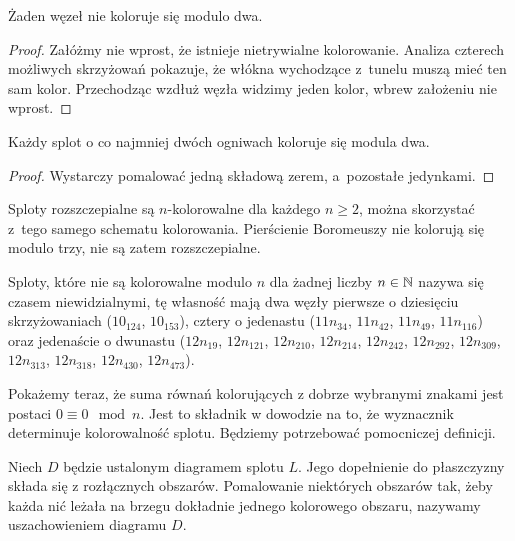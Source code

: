 \begin{proposition}
\label{prp:no_colourings_mod_2}%
    Żaden węzeł nie koloruje się modulo dwa.
\end{proposition}

\begin{proof}
    Załóżmy nie wprost, że istnieje nietrywialne kolorowanie.
    Analiza czterech możliwych skrzyżowań pokazuje, że włókna wychodzące z~tunelu muszą mieć ten sam kolor.
    Przechodząc wzdłuż węzła widzimy jeden kolor, wbrew założeniu nie wprost.
\end{proof}

\begin{proposition}
    Każdy splot o co najmniej dwóch ogniwach koloruje się modula dwa.
\end{proposition}

\begin{proof}
    Wystarczy pomalować jedną składową zerem, a~pozostałe jedynkami.
\end{proof}

Sploty rozszczepialne są $n$-kolorowalne dla każdego $n \ge 2$, można skorzystać z~tego samego schematu kolorowania.
%
Pierścienie Boromeuszy nie kolorują się modulo trzy, nie są zatem rozszczepialne.
\label{boromean_not_splittable}%
%

Sploty, które nie są kolorowalne modulo $n$ dla żadnej liczby $n \in \mathbb N$ nazywa się czasem niewidzialnymi, tę własność mają dwa węzły pierwsze o dziesięciu skrzyżowaniach ($10_{124}$, $10_{153}$), cztery o jedenastu ($11n_{34}$, $11n_{42}$, $11n_{49}$, $11n_{116}$) oraz jedenaście o dwunastu ($12n_{19}$, $12n_{121}$, $12n_{210}$, $12n_{214}$, $12n_{242}$, $12n_{292}$, $12n_{309}$, $12n_{313}$, $12n_{318}$, $12n_{430}$, $12n_{473}$).
%

Pokażemy teraz, że suma równań kolorujących z dobrze wybranymi znakami jest postaci $0 \equiv 0 \mod n$.
Jest to składnik w dowodzie na to, że wyznacznik determinuje kolorowalność splotu.
Będziemy potrzebować pomocniczej definicji.

\begin{definition}[uszachowienie]
%
    Niech $D$ będzie ustalonym diagramem splotu $L$.
    Jego dopełnienie do płaszczyzny składa się z rozłącznych obszarów.
    Pomalowanie niektórych obszarów tak, żeby każda nić leżała na brzegu dokładnie jednego kolorowego obszaru, nazywamy uszachowieniem diagramu $D$.
\end{definition}

